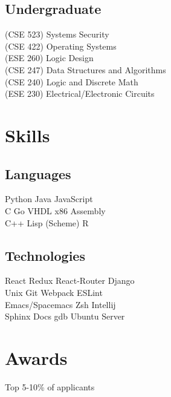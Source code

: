 \documentclass[]{deedy-resume-openfont}
\begin{document}
\begin{minipage}[t]{0.33\textwidth}
\subsection{Undergraduate}
(CSE 523) Systems Security\\
(CSE 422) Operating Systems\\
(ESE 260) Logic Design\\
(CSE 247) Data Structures and Algorithms\\
(CSE 240) Logic and Discrete Math\\
(ESE 230) Electrical/Electronic Circuits\\
\sectionsep


\section{Skills}
\subsection{Languages}
Python \textbullet{} Java \textbullet{} JavaScript \\
C \textbullet{} Go \textbullet{} VHDL \textbullet{} x86 Assembly \\
C++ \textbullet{} Lisp (Scheme) \textbullet{} R\\
\sectionsep

\subsection{Technologies}
React \textbullet{} Redux \textbullet{} React-Router \textbullet{} Django \\
Unix \textbullet{} Git \textbullet{} Webpack \textbullet{} ESLint \\
Emacs/Spacemacs \textbullet{} Zsh \textbullet{} Intellij \\
Sphinx Docs \textbullet{} gdb \textbullet{} Ubuntu Server \\
\sectionsep


\section{Awards}
\vspace{\topsep} %
\begin{tightemize}
\item Top 5-10\% of applicants
\end{tightemize}


\end{minipage}
\end{document}
